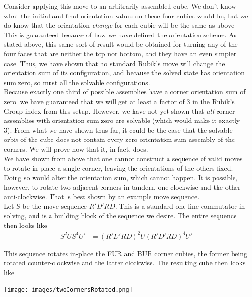 \documentclass[10pt,letterpaper]{report}
\begin{document}
Consider applying this move to an arbitrarily-assembled cube.  We don't know what the initial and final orientation values on these four cubies would be, but we do know that the orientation \textit{change} for each cubie will be the same as above.  This is guaranteed because of how we have defined the orientation scheme.  As stated above, this same sort of result would be obtained for turning any of the four faces that are neither the top nor bottom, and they have an even simpler case.  Thus, we have shown that no standard Rubik's move will change the orientation sum of its configuration, and because the solved state has orientation sum zero, so must all the solvable configurations. \\

Because exactly one third of possible assemblies have a corner orientation sum of zero, we have guaranteed that we will get at least a factor of 3 in the Rubik's Group index from this setup.  However, we have not yet shown that \textit{all} corner assemblies with orientation sum zero are solvable (which would make it exactly 3).  From what we have shown thus far, it could be the case that the solvable orbit of the cube does not contain every zero-orientation-sum assembly of the corners.  We will prove now that it, in fact, does. \\

We have shown from above that one cannot construct a sequence of valid moves to rotate in-place a single corner, leaving the orientations of the others fixed.  Doing so would alter the orientation sum, which cannot happen.  It is possible, however, to rotate two adjacent corners in tandem, one clockwise and the other anti-clockwise.  That is best shown by an example move sequence. \\

Let $S$ be the move sequence $R'D'RD$.  This is a standard one-line commutator in solving, and is a building block of the sequence we desire.  The entire sequence then looks like
\begin{align*}
S^2 U S^4 U' &= (R'D'RD)^2 U (R'D'RD)^4 U'
\end{align*}

This sequence rotates in-place the FUR and BUR corner cubies, the former being rotated counter-clockwise and the latter clockwise.  The resulting cube then looks like

\begin{center}
\texttt{[image: images/twoCornersRotated.png]} 
\end{center}
\end{document}
